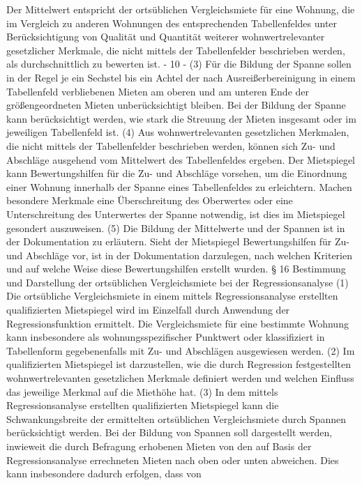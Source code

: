 Der Mittelwert entspricht der ortsüblichen Vergleichsmiete für eine Wohnung, die im Vergleich zu anderen Wohnungen des entsprechenden Tabellenfeldes unter Berücksichtigung
von Qualität und Quantität weiterer wohnwertrelevanter gesetzlicher Merkmale, die nicht
mittels der Tabellenfelder beschrieben werden, als durchschnittlich zu bewerten ist.
- 10 -
(3) Für die Bildung der Spanne sollen in der Regel je ein Sechstel bis ein Achtel der
nach Ausreißerbereinigung in einem Tabellenfeld verbliebenen Mieten am oberen und am
unteren Ende der größengeordneten Mieten unberücksichtigt bleiben. Bei der Bildung der
Spanne kann berücksichtigt werden, wie stark die Streuung der Mieten insgesamt oder im
jeweiligen Tabellenfeld ist.
(4) Aus wohnwertrelevanten gesetzlichen Merkmalen, die nicht mittels der Tabellenfelder beschrieben werden, können sich Zu- und Abschläge ausgehend vom Mittelwert des
Tabellenfeldes ergeben. Der Mietspiegel kann Bewertungshilfen für die Zu- und Abschläge
vorsehen, um die Einordnung einer Wohnung innerhalb der Spanne eines Tabellenfeldes
zu erleichtern. Machen besondere Merkmale eine Überschreitung des Oberwertes oder
eine Unterschreitung des Unterwertes der Spanne notwendig, ist dies im Mietspiegel gesondert auszuweisen.
(5) Die Bildung der Mittelwerte und der Spannen ist in der Dokumentation zu erläutern.
Sieht der Mietspiegel Bewertungshilfen für Zu- und Abschläge vor, ist in der Dokumentation
darzulegen, nach welchen Kriterien und auf welche Weise diese Bewertungshilfen erstellt
wurden.
§ 16
Bestimmung und Darstellung der ortsüblichen Vergleichsmiete bei der Regressionsanalyse
(1) Die ortsübliche Vergleichsmiete in einem mittels Regressionsanalyse erstellten
qualifizierten Mietspiegel wird im Einzelfall durch Anwendung der Regressionsfunktion ermittelt. Die Vergleichsmiete für eine bestimmte Wohnung kann insbesondere als wohnungsspezifischer Punktwert oder klassifiziert in Tabellenform gegebenenfalls mit Zu- und Abschlägen ausgewiesen werden.
(2) Im qualifizierten Mietspiegel ist darzustellen, wie die durch Regression festgestellten wohnwertrelevanten gesetzlichen Merkmale definiert werden und welchen Einfluss das
jeweilige Merkmal auf die Miethöhe hat.
(3) In dem mittels Regressionsanalyse erstellten qualifizierten Mietspiegel kann die
Schwankungsbreite der ermittelten ortsüblichen Vergleichsmiete durch Spannen berücksichtigt werden. Bei der Bildung von Spannen soll dargestellt werden, inwieweit die durch
Befragung erhobenen Mieten von den auf Basis der Regressionsanalyse errechneten Mieten nach oben oder unten abweichen. Dies kann insbesondere dadurch erfolgen, dass von
